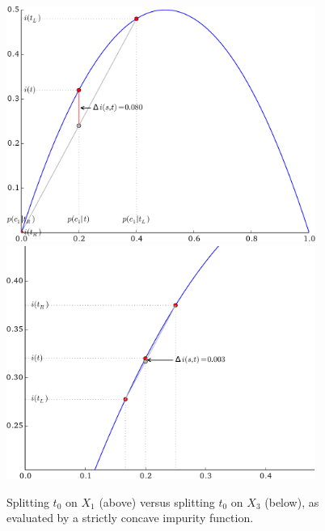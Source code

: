 \begin{figure}
\centering
\includegraphics[width=0.9\textwidth]{figures/ch3_toy_x1_gini.pdf}\\
\vspace{1cm}
\includegraphics[width=0.9\textwidth]{figures/ch3_toy_x3_gini.pdf}
\caption{Splitting $t_0$ on $X_1$ (above) versus splitting $t_0$ on $X_3$ (below), as evaluated by a strictly concave impurity function.}
\label{fig:3:toy:impurity:gini}
\end{figure}


